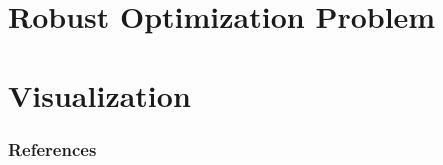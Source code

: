 \documentclass{beamer}
\begin{document}

\section{Robust Optimization Problem}






\section{Visualization}






\begin{frame}
\frametitle{References}
\nocite{*}


\end{frame}
\end{document}
